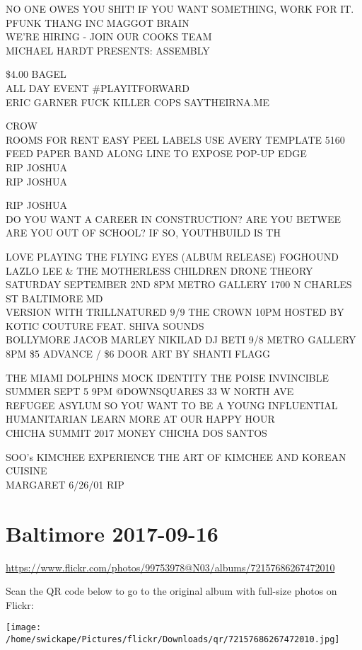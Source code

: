 \documentclass[10pt,letterpaper]{article}
\begin{document}
NO ONE OWES YOU SHIT!  IF YOU WANT SOMETHING, WORK FOR IT.\\
PFUNK THANG INC MAGGOT BRAIN\\
WE'RE HIRING {-} JOIN OUR COOKS TEAM\\
MICHAEL HARDT PRESENTS: ASSEMBLY

\$4.00 BAGEL\\
ALL DAY EVENT \#PLAYITFORWARD\\
ERIC GARNER FUCK KILLER COPS SAYTHEIRNA.ME

CROW\\
ROOMS FOR RENT EASY PEEL LABELS USE AVERY TEMPLATE 5160 FEED PAPER BAND ALONG LINE TO EXPOSE POP{-}UP EDGE\\
RIP JOSHUA\\
RIP JOSHUA

RIP JOSHUA\\
DO YOU WANT A CAREER IN CONSTRUCTION?  ARE YOU BETWEE  ARE YOU OUT OF SCHOOL?  IF SO, YOUTHBUILD IS TH

LOVE PLAYING THE FLYING EYES (ALBUM RELEASE) FOGHOUND LAZLO LEE \& THE MOTHERLESS CHILDREN DRONE THEORY SATURDAY SEPTEMBER 2ND 8PM METRO GALLERY 1700 N CHARLES ST BALTIMORE MD\\
VERSION WITH TRILLNATURED 9/9 THE CROWN 10PM HOSTED BY KOTIC COUTURE FEAT. SHIVA SOUNDS\\
BOLLYMORE JACOB MARLEY NIKILAD DJ BETI 9/8 METRO GALLERY 8PM \$5 ADVANCE / \$6 DOOR ART BY SHANTI FLAGG

THE MIAMI DOLPHINS MOCK IDENTITY THE POISE INVINCIBLE SUMMER SEPT 5 9PM @DOWNSQUARES 33 W NORTH AVE\\
REFUGEE ASYLUM SO YOU WANT TO BE A YOUNG INFLUENTIAL HUMANITARIAN LEARN MORE AT OUR HAPPY HOUR\\
CHICHA SUMMIT 2017 MONEY CHICHA DOS SANTOS

SOO's KIMCHEE EXPERIENCE THE ART OF KIMCHEE AND KOREAN CUISINE\\
MARGARET 6/26/01 RIP
\pagebreak

\section*{Baltimore 2017-09-16}

\url{https://www.flickr.com/photos/99753978@N03/albums/72157686267472010}

Scan the QR code below to go to the original album with full-size photos on Flickr:

\texttt{[image: /home/swickape/Pictures/flickr/Downloads/qr/72157686267472010.jpg]}
\pagebreak
\end{document}
